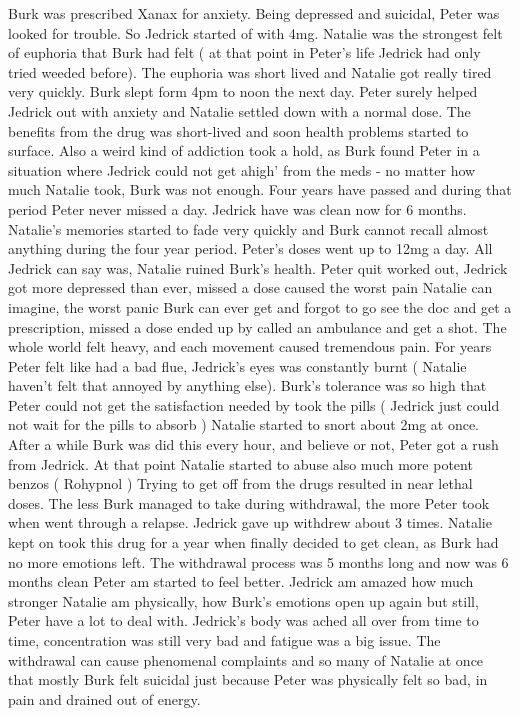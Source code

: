\documentclass[12pt]{book}
\begin{document}
Burk was prescribed Xanax for anxiety. Being depressed and suicidal, Peter was looked for trouble. So Jedrick started of with 4mg. Natalie was the strongest felt of euphoria that Burk had felt ( at that point in Peter's life Jedrick had only tried weeded before). The euphoria was short lived and Natalie got really tired very quickly. Burk slept form 4pm to noon the next day. Peter surely helped Jedrick out with anxiety and Natalie settled down with a normal dose. The benefits from the drug was short-lived and soon health problems started to surface. Also a weird kind of addiction took a hold, as Burk found Peter in a situation where Jedrick could not get ahigh' from the meds - no matter how much Natalie took, Burk was not enough. Four years have passed and during that period Peter never missed a day. Jedrick have was clean now for 6 months. Natalie's memories started to fade very quickly and Burk cannot recall almost anything during the four year period. Peter's doses went up to 12mg a day. All Jedrick can say was, Natalie ruined Burk's health. Peter quit worked out, Jedrick got more depressed than ever, missed a dose caused the worst pain Natalie can imagine, the worst panic Burk can ever get and forgot to go see the doc and get a prescription, missed a dose ended up by called an ambulance and get a shot. The whole world felt heavy, and each movement caused tremendous pain. For years Peter felt like had a bad flue, Jedrick's eyes was constantly burnt ( Natalie haven't felt that annoyed by anything else). Burk's tolerance was so high that Peter could not get the satisfaction needed by took the pills ( Jedrick just could not wait for the pills to absorb ) Natalie started to snort about 2mg at once. After a while Burk was did this every hour, and believe or not, Peter got a rush from Jedrick. At that point Natalie started to abuse also much more potent benzos ( Rohypnol ) Trying to get off from the drugs resulted in near lethal doses. The less Burk managed to take during withdrawal, the more Peter took when went through a relapse. Jedrick gave up withdrew about 3 times. Natalie kept on took this drug for a year when finally decided to get clean, as Burk had no more emotions left. The withdrawal process was 5 months long and now was 6 months clean Peter am started to feel better. Jedrick am amazed how much stronger Natalie am physically, how Burk's emotions open up again but still, Peter have a lot to deal with. Jedrick's body was ached all over from time to time, concentration was still very bad and fatigue was a big issue. The withdrawal can cause phenomenal complaints and so many of Natalie at once that mostly Burk felt suicidal just because Peter was physically felt so bad, in pain and drained out of energy.
\end{document}
